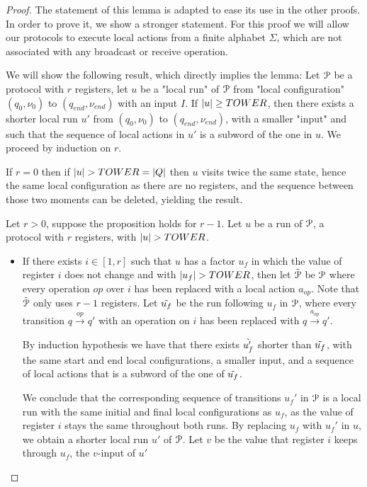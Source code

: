 \begin{proof}
	The statement of this lemma is adapted to ease its use in the other proofs.
	In order to prove it, we show a stronger statement.	
	For this proof we will allow our protocols to execute local actions from a finite alphabet $\Sigma$, which are not associated with any broadcast or receive operation.	
	
	We will show the following result, which directly implies the lemma:
	Let $\mathcal{P}$ be a protocol with $r$ registers, let $u$ be a "local run" of $\mathcal{P}$ from "local configuration" $(q_0, \nu_0)$ to $(q_{end}, \nu_{end})$ with an input $I$. If $|u| \geq TOWER$, then there exists a shorter local run $u'$ from $(q_0, \nu_0)$ to $(q_{end}, \nu_{end})$, with a smaller "input" and such that the sequence of local actions in $u'$ is a subword of the one in $u$.
	We proceed by induction on $r$.
	
	If $r=0$ then if $|u| > TOWER = |Q|$ then $u$ visits twice the same state, hence the same local configuration as there are no registers, and the sequence between those two moments can be deleted, yielding the result.
	
	Let $r>0$, suppose the proposition holds for $r-1$.
	Let $u$ be a run of $\mathcal{P}$, a protocol with $r$ registers, with $|u| > TOWER$.
	
	\begin{itemize}
		\item If there exists $i \in [1,r]$ such that $u$ has a factor $u_f$ in which the value of register $i$ does not change and with $|u_f| > TOWER$, then let $\Tilde{\mathcal{P}}$ be $\mathcal{P}$ where every operation $op$ over $i$ has been replaced with a local action $a_{op}$. Note that $\Tilde{\mathcal{P}}$ only uses $r-1$ registers. 
		Let $\Tilde{u_f}$ be the run following $u_f$ in $\mathcal{P}$, where every transition $q \xrightarrow{op} q'$ with an operation on $i$ has been replaced with $q \xrightarrow{a_{op}} q'$.
		
		By induction hypothesis we have that there exists $\Tilde{u'_f}$ shorter than $\Tilde{u_f}$, with the same start and end local configurations, a smaller input, and a sequence of local actions that is a subword of the one of $\Tilde{u_f}$.
		
		We conclude that the corresponding sequence of transitions $u_f'$ in $\mathcal{P}$ is a local run with the same initial and final local configurations as $u_f$, as the value of register $i$ stays the same throughout both runs. By replacing $u_f$ with $u_f'$ in $u$, we obtain a shorter local run $u'$ of $\mathcal{P}$. Let $v$ be the value that register $i$ keeps through $u_f$, the $v$-input of $u'$ 
		

\end{itemize}
\end{proof}
